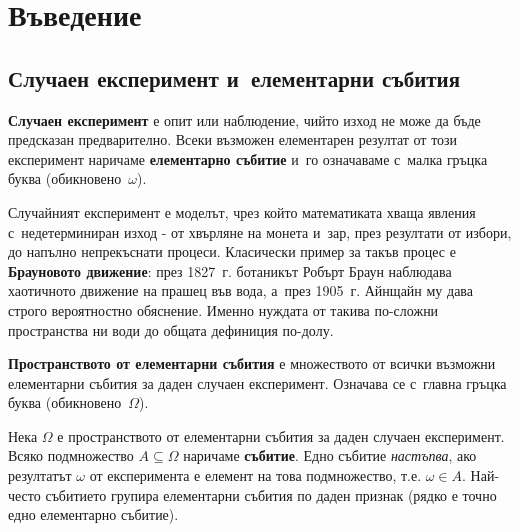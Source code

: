 \chapter{Въведение}

\section{Случаен експеримент и~елементарни събития}

\begin{defbox}
\textbf{Случаен експеримент} е опит или наблюдение, чийто изход не може
да бъде предсказан предварително. Всеки възможен елементарен резултат
от този експеримент наричаме \textbf{елементарно събитие} и~го
означаваме с~малка гръцка буква (обикновено~$\omega$).
\end{defbox}

\begin{rembox}[Мотивация]
Случайният експеримент е моделът, чрез който математиката хваща
явления с~недетерминиран изход - от хвърляне на монета и~зар, през
резултати от избори, до напълно непрекъснати процеси. Класически
пример за такъв процес е \textbf{Брауновото движение}: през 1827~г.
ботаникът Робърт Браун наблюдава хаотичното движение на прашец във
вода, а~през 1905~г. Айнщайн му дава строго вероятностно обяснение.
Именно нуждата от такива по-сложни пространства ни води до общата
дефиниция по-долу.
\end{rembox}

\begin{defbox}
\textbf{Пространството от елементарни събития} е множеството от
всички възможни елементарни събития за даден случаен експеримент.
Означава се с~главна гръцка буква (обикновено~$\Omega$).
\end{defbox}

\begin{defbox}[~(Събитие)]
Нека $\Omega$ е пространството от елементарни събития за даден
случаен експеримент. Всяко подмножество $A \subseteq \Omega$ наричаме
\textbf{събитие}. Едно събитие \emph{настъпва}, ако резултатът
$\omega$ от експеримента е елемент на това подмножество, т.е.
$\omega \in A$. Най-често събитието групира елементарни събития по
даден признак (рядко е точно едно елементарно събитие).
\end{defbox}

